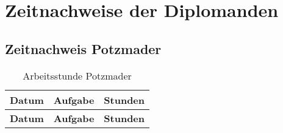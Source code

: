 \chapter{Zeitnachweise der Diplomanden}
\renewcommand{\arraystretch}{1.8}

\section{Zeitnachweis Potzmader}
\renewcommand{\arraystretch}{1.8}

\begin{longtable}{|l|p{9cm}|c|}
    \caption{Arbeitsstunde Potzmader} \\
    \hline
    \textbf{Datum} & \textbf{Aufgabe} & \textbf{Stunden} \\
    \hline
    \endfirsthead

    \hline
    \textbf{Datum} & \textbf{Aufgabe} & \textbf{Stunden} \\
    \hline
    \endhead


\end{longtable}

